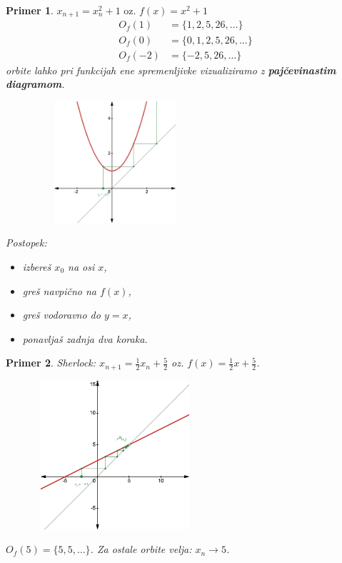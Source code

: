 \documentclass{article}
\newtheorem{primer}{Primer}
\begin{document}
\begin{primer}
$x_{n+1} = x_n^2 + 1 \text{ oz. } f(x) = x^2 + 1$
\begin{align*}
O_f(1) &= \{1, 2, 5, 26, \dots\} \\ 
O_f(0) &= \{0, 1, 2, 5, 26, \dots\}\\
O_f(-2) &= \{-2, 5, 26, \dots \}
\end{align*}
orbite lahko pri funkcijah ene spremenljivke vizualiziramo z \textbf{pajčevinastim diagramom}.

\begin{figure}[h]
\begin{centering}
    \includegraphics[width=6cm, height=4.5cm]{Grafi/cobweb1.png}
\end{centering}
\end{figure}

\newpage
Postopek:
\begin{itemize}
\item izbereš $x_0$ na osi $x$,
\item greš navpično na $f(x)$,
\item greš vodoravno do $y = x$,
\item ponavljaš zadnja dva koraka.
\end{itemize}
\end{primer}


\begin{primer}
Sherlock: $x_{n+1} = \frac{1}{2} x_n + \frac{5}{2}$ oz. $f(x) = \frac{1}{2} x + \frac{5}{2}$.\\ 

\begin{figure}[h]
    \begin{centering}
   \includegraphics[width=6cm, height=5.5cm]{Grafi/cobweb2.png}
    \end{centering}
\end{figure}
    
$O_f(5) = \{5, 5, \dots \}$. Za ostale orbite velja: $x_n \rightarrow 5$.
\end{primer}
\end{document}
